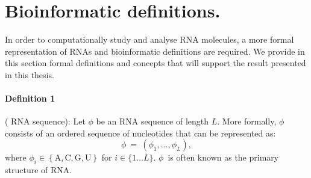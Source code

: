 

\section{Bioinformatic definitions.}
In order to computationally study and analyse RNA molecules, a more formal representation of RNAs and bioinformatic definitions are required. We provide in this section formal definitions and concepts that will support the result presented in this thesis.

\paragraph{\textbf{Definition 1}} ( RNA sequence): Let $\phi$ be an RNA sequence of length $L$.  More formally, $\phi$ consists of an ordered sequence of nucleotides that can be represented as:~ \begin{equation}
\phi\ =\ \left(\phi_1,...,\phi_L\right),
\end{equation}
where $\phi_i\in\left\{\text{A},\text{C},\text{G},\text{U}\right\}$ for $i\in \{1\dots L\}$.
\(\phi\)~is often known as the primary structure of RNA.

